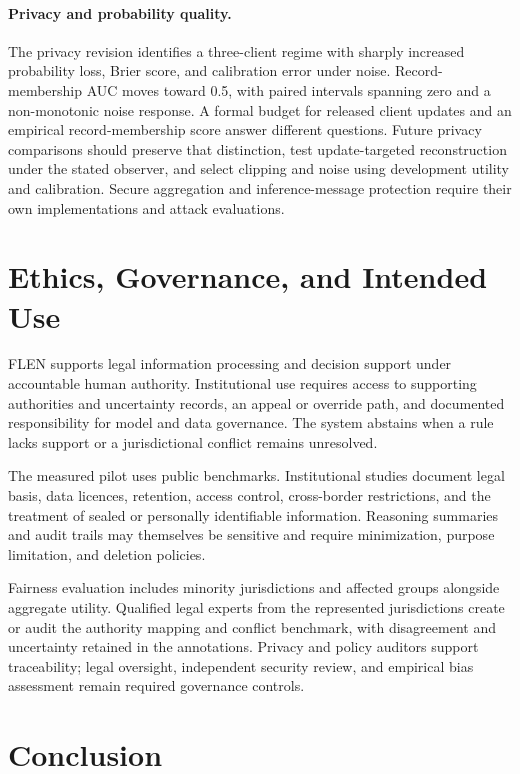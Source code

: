 \documentclass[a4paper,fleqn]{cas-sc}
\begin{document}
\paragraph{Privacy and probability quality.}
The privacy revision identifies a three-client regime with sharply increased probability loss, Brier score, and calibration error under noise. Record-membership AUC moves toward 0.5, with paired intervals spanning zero and a non-monotonic noise response. A formal budget for released client updates and an empirical record-membership score answer different questions. Future privacy comparisons should preserve that distinction, test update-targeted reconstruction under the stated observer, and select clipping and noise using development utility and calibration. Secure aggregation and inference-message protection require their own implementations and attack evaluations.

\section{Ethics, Governance, and Intended Use}

FLEN supports legal information processing and decision support under accountable human authority. Institutional use requires access to supporting authorities and uncertainty records, an appeal or override path, and documented responsibility for model and data governance. The system abstains when a rule lacks support or a jurisdictional conflict remains unresolved.

The measured pilot uses public benchmarks. Institutional studies document legal basis, data licences, retention, access control, cross-border restrictions, and the treatment of sealed or personally identifiable information. Reasoning summaries and audit trails may themselves be sensitive and require minimization, purpose limitation, and deletion policies.

Fairness evaluation includes minority jurisdictions and affected groups alongside aggregate utility. Qualified legal experts from the represented jurisdictions create or audit the authority mapping and conflict benchmark, with disagreement and uncertainty retained in the annotations. Privacy and policy auditors support traceability; legal oversight, independent security review, and empirical bias assessment remain required governance controls.

\section{Conclusion}
\end{document}
